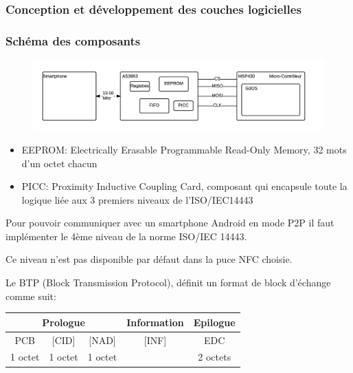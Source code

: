 \documentclass{beamer}
\begin{document}
\subsubsection{Conception et développement des couches logicielles}
\begin{frame}
\frametitle{Schéma des composants}
\begin{figure}
\centering
\includegraphics[scale=0.5]{images/block-diagram.png}
\end{figure}
\begin{itemize}
\item EEPROM: Electrically Erasable Programmable Read-Only Memory, 32 mots d'un octet chacun
\item PICC: Proximity Inductive Coupling Card, composant qui encapsule toute la logique liée aux 3 premiers niveaux de l'ISO/IEC14443 
\end{itemize}

\end{frame}


\begin{frame}

Pour pouvoir communiquer avec un smartphone Android en mode P2P il faut implémenter le 4ème niveau de la norme ISO/IEC 14443.

Ce niveau n'est pas disponible par défaut dans la puce NFC choisie.

Le BTP (Block Transmission Protocol), définit un format de block d'échange comme suit:
\begin{tabular}[hf]{|c|c|c|c|c|c|c|c|}
\hline
\multicolumn{3}{|c|}{Prologue} & \multicolumn{3}{c|}{Information} & \multicolumn{2}{c|}{Epilogue} \\
\hline
PCB & [CID] & [NAD] & \multicolumn{3}{|c|}{[INF]} & \multicolumn{2}{c|}{EDC}\\
\hline
1 octet & 1 octet & 1 octet & \multicolumn{3}{|c|}{} & \multicolumn{2}{c|}{2 octets}\\
\hline
\end{tabular}
\end{frame}
\end{document}
